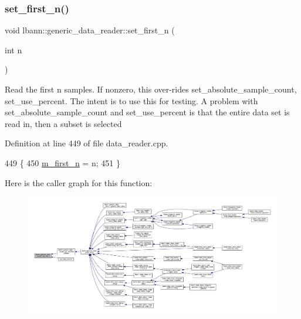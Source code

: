 \subsubsection{\texorpdfstring{set\+\_\+first\+\_\+n()}{set\_first\_n()}}
{\footnotesize\ttfamily void lbann\+::generic\+\_\+data\+\_\+reader\+::set\+\_\+first\+\_\+n (\begin{DoxyParamCaption}\item[{int}]{n }\end{DoxyParamCaption})}

Read the first \textquotesingle{}n\textquotesingle{} samples. If nonzero, this over-\/rides set\+\_\+absolute\+\_\+sample\+\_\+count, set\+\_\+use\+\_\+percent. The intent is to use this for testing. A problem with set\+\_\+absolute\+\_\+sample\+\_\+count and set\+\_\+use\+\_\+percent is that the entire data set is read in, then a subset is selected 

Definition at line 449 of file data\+\_\+reader.\+cpp.


\begin{DoxyCode}
449                                            \{
450   \hyperlink{classlbann_1_1generic__data__reader_a51af253029b7daea29bc46cbbef686b3}{m\_first\_n} = n;
451 \}
\end{DoxyCode}
Here is the caller graph for this function\+:\nopagebreak
\begin{figure}[H]
\begin{center}
\leavevmode
\includegraphics[width=350pt]{classlbann_1_1generic__data__reader_aca4e6c31df0a1579079274bc48fbbf26_icgraph}
\end{center}
\end{figure}
\mbox{\label{classlbann_1_1generic__data__reader_a4455d137b469287bf964436f9fcc6d94}} 
